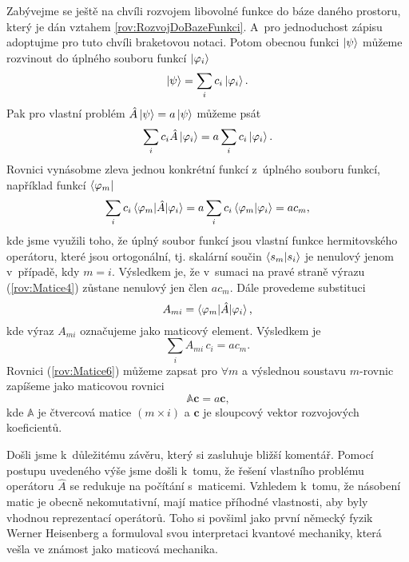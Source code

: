Zabývejme se ještě na chvíli rozvojem libovolné funkce do báze daného prostoru, který je dán vztahem \eqref{rov:RozvojDoBazeFunkci}. A~pro jednoduchost zápisu adoptujme pro tuto chvíli braketovou notaci. Potom obecnou funkci $\ket{\psi}$ můžeme rozvinout do úplného souboru funkcí $\ket{\varphi_i}$
\begin{equation}
\ket{\psi} = \sum_i c_i \ket{\varphi_i} \mbox{.}
\nonumber
\end{equation}
Pak pro vlastní problém $\hat{A} \ket{\psi} = a \ket{\psi}$ můžeme psát
\begin{equation}
\sum_i c_i \hat{A} \ket{\varphi_i} = a \sum_i c_i \ket{\varphi_i} \mbox{.}
\nonumber
\end{equation}
Rovnici vynásobme zleva jednou konkrétní funkcí z~úplného souboru funkcí, například funkcí $\bra{\varphi_m}$
\begin{equation}
\sum_i c_i \braket{\varphi_m|\hat{A}|\varphi_i} = a \sum_i c_i \braket{\varphi_m|\varphi_i}= a c_m \mbox{,}
\label{rov:Matice4}
\end{equation}
kde jsme využili toho, že úplný soubor funkcí jsou vlastní funkce hermitovského operátoru, které jsou ortogonální, tj. skalární součin $\braket{s_m|s_i}$ je nenulový jenom v~případě, kdy $m=i$. Výsledkem je, že v~sumaci na pravé straně výrazu (\ref{rov:Matice4}) zůstane nenulový jen člen $a c_m$. Dále provedeme substituci
\begin{equation}
A_{mi} = \braket{\varphi_m|\hat{A}|\varphi_i} \mbox{,}
\nonumber
\end{equation}
kde výraz $A_{mi}$ označujeme jako maticový element. Výsledkem je 
\begin{equation}
\sum_i A_{mi} \, c_i = a c_m \mbox{.}
\label{rov:Matice6}
\end{equation}
Rovnici (\ref{rov:Matice6}) můžeme zapsat pro $\forall m$ a výslednou soustavu $m$-rovnic zapíšeme jako maticovou rovnici
\begin{equation}
\boxed{\mathbb{A} \mathbf{c} = a \mathbf{c} \mbox{,}}
\label{rov:Matice7-vysledek}
\end{equation}
kde $\mathbb{A}$ je čtvercová matice $(m \times i)$ a $\mathbf{c}$ je sloupcový vektor rozvojových koeficientů.

Došli jsme k~důležitému závěru, který si zasluhuje bližší komentář. Pomocí postupu uvedeného výše jsme došli k~tomu, že řešení vlastního problému operátoru $\hat{A}$ se redukuje na počítání s~maticemi. Vzhledem k~tomu, že násobení matic je obecně nekomutativní, mají matice příhodné vlastnosti, aby byly vhodnou reprezentací operátorů. Toho si povšiml jako první německý fyzik Werner Heisenberg a formuloval svou interpretaci kvantové mechaniky, která vešla ve známost jako maticová mechanika.








